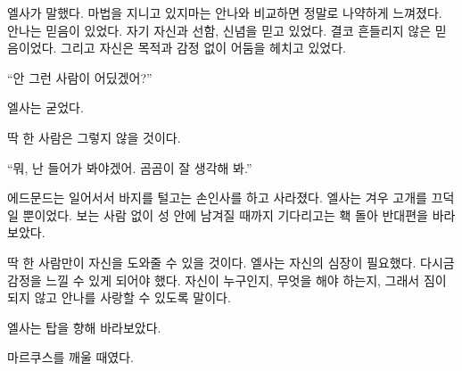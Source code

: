 엘사가 말했다. 마법을 지니고 있지마는 안나와 비교하면 정말로 나약하게 느껴졌다. 안나는 믿음이 있었다. 자기 자신과 선함, 신념을 믿고 있었다. 결코 흔들리지 않은 믿음이었다. 그리고 자신은 목적과 감정 없이 어둠을 헤치고 있었다.

``안 그런 사람이 어딨겠어?''

엘사는 굳었다.

딱 한 사람은 그렇지 않을 것이다.

``뭐, 난 들어가 봐야겠어. 곰곰이 잘 생각해 봐.''

에드문드는 일어서서 바지를 털고는 손인사를 하고 사라졌다. 엘사는 겨우 고개를 끄덕일 뿐이었다. 보는 사람 없이 성 안에 남겨질 때까지 기다리고는 홱 돌아 반대편을 바라보았다.

딱 한 사람만이 자신을 도와줄 수 있을 것이다. 엘사는 자신의 심장이 필요했다. 다시금 감정을 느낄 수 있게 되어야 했다. 자신이 누구인지, 무엇을 해야 하는지, 그래서 짐이 되지 않고 안나를 사랑할 수 있도록 말이다.

엘사는 탑을 향해 바라보았다.

마르쿠스를 깨울 때였다.

